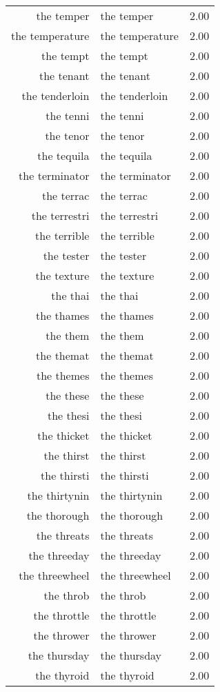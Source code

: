 \begin{table}[ht]
\begin{tabular}{rlr}
  the temper & the temper & 2.00 \\ 
  the temperature & the temperature & 2.00 \\ 
  the tempt & the tempt & 2.00 \\ 
  the tenant & the tenant & 2.00 \\ 
  the tenderloin & the tenderloin & 2.00 \\ 
  the tenni & the tenni & 2.00 \\ 
  the tenor & the tenor & 2.00 \\ 
  the tequila & the tequila & 2.00 \\ 
  the terminator & the terminator & 2.00 \\ 
  the terrac & the terrac & 2.00 \\ 
  the terrestri & the terrestri & 2.00 \\ 
  the terrible & the terrible & 2.00 \\ 
  the tester & the tester & 2.00 \\ 
  the texture & the texture & 2.00 \\ 
  the thai & the thai & 2.00 \\ 
  the thames & the thames & 2.00 \\ 
  the them & the them & 2.00 \\ 
  the themat & the themat & 2.00 \\ 
  the themes & the themes & 2.00 \\ 
  the these & the these & 2.00 \\ 
  the thesi & the thesi & 2.00 \\ 
  the thicket & the thicket & 2.00 \\ 
  the thirst & the thirst & 2.00 \\ 
  the thirsti & the thirsti & 2.00 \\ 
  the thirtynin & the thirtynin & 2.00 \\ 
  the thorough & the thorough & 2.00 \\ 
  the threats & the threats & 2.00 \\ 
  the threeday & the threeday & 2.00 \\ 
  the threewheel & the threewheel & 2.00 \\ 
  the throb & the throb & 2.00 \\ 
  the throttle & the throttle & 2.00 \\ 
  the thrower & the thrower & 2.00 \\ 
  the thursday & the thursday & 2.00 \\ 
  the thyroid & the thyroid & 2.00 \\ 

\end{tabular}
\end{table}
